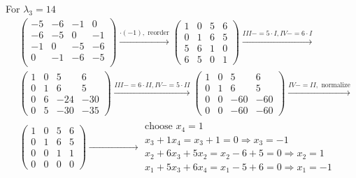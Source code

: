 \documentclass[a4paper,german,12pt,smallheadings]{scrartcl}
\begin{document}
\begin{enumerate}[a)]
    For $\lambda_3 = 14$
    \begin{align*}
      &\begin{pmatrix}
        -5 & -6 & -1 & 0 \\
        -6 & -5 & 0 & -1 \\
        -1 & 0 & -5 & -6 \\
        0 & -1 & -6 & -5 \\
      \end{pmatrix}
      \xrightarrow{\cdot (-1),\text{ reorder}}
      \begin{pmatrix}
        1 & 0 & 5 & 6 \\
        0 & 1 & 6 & 5 \\
        5 & 6 & 1 & 0 \\
        6 & 5 & 0 & 1
      \end{pmatrix}
      \xrightarrow{III-= 5 \cdot I, IV -= 6 \cdot I} \\
      &\begin{pmatrix}
        1 & 0 & 5 & 6 \\
        0 & 1 & 6 & 5 \\
        0 & 6 & -24 & -30 \\
        0 & 5 & -30 & -35
      \end{pmatrix}
      \xrightarrow{III -= 6 \cdot II, IV -= 5 \cdot II}
      \begin{pmatrix}
        1 & 0 & 5 & 6 \\
        0 & 1 & 6 & 5 \\
        0 & 0 & -60 & -60 \\
        0 & 0 & -60 & -60
      \end{pmatrix}
      \xrightarrow{IV -= II,\text{ normalize}} \\
      &\begin{pmatrix}
        1 & 0 & 5 & 6 \\
        0 & 1 & 6 & 5 \\
        0 & 0 & 1 & 1 \\
        0 & 0 & 0 & 0
      \end{pmatrix}
      \xrightarrow{\hspace{3cm}}
      \begin{matrix}
        \text{choose } x_4 = 1 \\
        x_3 + 1x_4 = x_3 + 1 = 0 \Rightarrow x_3 = -1 \\
        x_2 + 6x_3 + 5x_2 = x_2 -6 +5 = 0 \Rightarrow x_2 = 1 \\
        x_1 + 5x_3 + 6x_4 = x_1 -5 +6 = 0 \Rightarrow x_1 = -1
      \end{matrix}
    \end{align*}


\end{enumerate}
\end{document}
